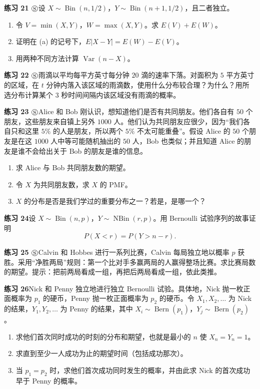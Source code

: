 \documentclass[UTF8,12pt,a4paper,fontset=fandol]{ctexart}
\begin{document}
\noindent\textbf{练习 21 $\circledS$}\quad 设 $X\sim\operatorname{Bin}(n,1/2)$，$Y\sim\operatorname{Bin}(n+1,1/2)$，且二者独立。
\begin{enumerate}
  \item[(a)] 令 $V=\min(X,Y)$，$W=\max(X,Y)$。求 $E(V)+E(W)$。
  \item[(b)] 证明在 (a) 的记号下，$E|X-Y|=E(W)-E(V)$。
  \item[(c)] 用两种不同方法计算 $\operatorname{Var}(n-X)$。
\end{enumerate}

\noindent\textbf{练习 22 $\circledS$}\quad 雨滴以平均每平方英寸每分钟 $20$ 滴的速率下落。对面积为 $5$ 平方英寸的区域，在 $t$ 分钟内落入该区域的雨滴数，使用什么分布较合理？为什么？用所选分布计算某个 $3$ 秒时间间隔内该区域没有雨滴的概率。

\noindent\textbf{练习 23 $\circledS$}\quad Alice 和 Bob 刚认识，想知道他们是否有共同朋友。他们各自有 $50$ 个朋友，这些朋友来自镇上另外 $1000$ 人。他们认为共同朋友应很少，因为“我们各自只和这里 $5\%$ 的人是朋友，所以两个 $5\%$ 不太可能重叠”。假设 Alice 的 $50$ 个朋友是在这 $1000$ 人中等可能随机抽出的 $50$ 人，Bob 也类似；并且知道 Alice 的朋友是谁不会给出关于 Bob 的朋友是谁的信息。
\begin{enumerate}
  \item[(a)] 求 Alice 与 Bob 共同朋友数的期望。
  \item[(b)] 令 $X$ 为共同朋友数，求 $X$ 的 PMF。
  \item[(c)] $X$ 的分布是否是我们学过的重要分布之一？若是，是哪一个？
\end{enumerate}

\noindent\textbf{练习 24}\quad 设 $X\sim\operatorname{Bin}(n,p)$，$Y\sim\operatorname{NBin}(r,p)$。用 Bernoulli 试验序列的故事证明
\[
  P(X<r)=P(Y>n-r).
\]

\noindent\textbf{练习 25 $\circledS$}\quad Calvin 和 Hobbes 进行一系列比赛，Calvin 每局独立地以概率 $p$ 获胜。采用“净胜两局”规则：第一个比对手多赢两局的人赢得整场比赛。求比赛局数的期望。提示：把前两局看成一组，再把后两局看成一组，依此类推。

\noindent\textbf{练习 26}\quad Nick 和 Penny 独立地进行独立 Bernoulli 试验。具体地，Nick 抛一枚正面概率为 $p_1$ 的硬币，Penny 抛一枚正面概率为 $p_2$ 的硬币。令 $X_1,X_2,\ldots$ 为 Nick 的结果，$Y_1,Y_2,\ldots$ 为 Penny 的结果，其中 $X_i\sim\operatorname{Bern}(p_1)$，$Y_j\sim\operatorname{Bern}(p_2)$。
\begin{enumerate}
  \item[(a)] 求他们首次同时成功的时刻的分布和期望，也就是最小的 $n$ 使 $X_n=Y_n=1$。
  \item[(b)] 求直到至少一人成功为止的期望时间（包括成功那次）。
  \item[(c)] 当 $p_1=p_2$ 时，求他们首次成功同时发生的概率，并由此求 Nick 的首次成功早于 Penny 的概率。
\end{enumerate}
\end{document}

